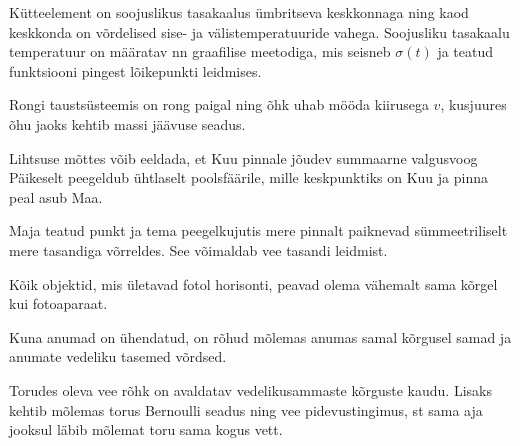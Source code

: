 \documentclass[10pt]{article}
\begin{document}
{%

\hint
Kütteelement on soojuslikus tasakaalus ümbritseva keskkonnaga ning kaod keskkonda on võrdelised sise- ja välistemperatuuride vahega. Soojusliku tasakaalu temperatuur on määratav nn graafilise meetodiga, mis seisneb $\sigma (t)$ ja teatud funktsiooni pingest lõikepunkti leidmises.
\probend
\bigskip


\hint
Rongi taustsüsteemis on rong paigal ning õhk uhab mööda kiirusega $v$, kusjuures õhu jaoks kehtib massi jäävuse seadus.
\probend
\bigskip


\hint
Lihtsuse mõttes võib eeldada, et Kuu pinnale jõudev summaarne valgusvoog Päikeselt peegeldub ühtlaselt poolsfäärile, mille keskpunktiks on Kuu ja pinna peal asub Maa.
\probend
\bigskip


\hint
Maja teatud punkt ja tema peegelkujutis mere pinnalt paiknevad sümmeetriliselt mere tasandiga võrreldes. See võimaldab vee tasandi leidmist.
\probend
\bigskip


\hint
Kõik objektid, mis ületavad fotol horisonti, peavad olema vähemalt sama kõrgel kui fotoaparaat.
\probend
\bigskip


\hint
Kuna anumad on ühendatud, on rõhud mõlemas anumas samal kõrgusel samad ja anumate vedeliku tasemed võrdsed.
\probend
\bigskip


\hint
Torudes oleva vee rõhk on avaldatav vedelikusammaste kõrguste kaudu. Lisaks kehtib mõlemas torus Bernoulli seadus ning vee pidevustingimus, st sama aja jooksul läbib mõlemat toru sama kogus vett.
\probend
\bigskip

}
\end{document}
